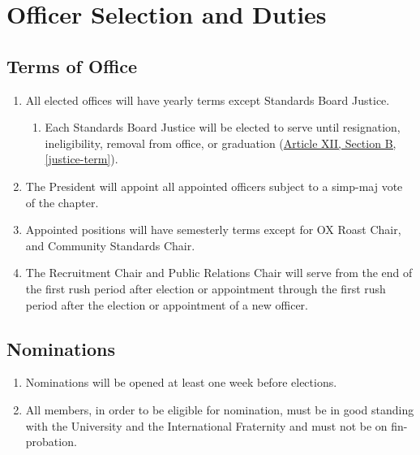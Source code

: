 \chapter{Officer Selection and Duties}

\section{Terms of Office}
	\begin{enumerate}
		\item All elected offices will have yearly terms except Standards Board Justice.
			\begin{enumerate}

				\item Each Standards Board Justice will be elected to serve until resignation, ineligibility, removal from office, or graduation (\hyperref[justice-term]{Article XII, Section B, \autoref*{justice-term}}).
			\end{enumerate}
		\item The President will appoint all appointed officers subject to a \gls{simp-maj} vote of the chapter. \label{appointed-approval}

		\item Appointed positions will have semesterly terms except for OX Roast Chair, and Community Standards Chair.

		\item The Recruitment Chair and Public Relations Chair will serve from the end of the first \gls{rush} period after election or appointment through the first \gls{rush} period after the election or appointment of a new officer.
	\end{enumerate}

\section{Nominations}
	\begin{enumerate}
		\item Nominations will be opened at least one week before elections.
		\item All members, in order to be eligible for nomination, must be in good standing with the University and the International Fraternity and must not be on \gls{fin-probation}.
	\end{enumerate}


